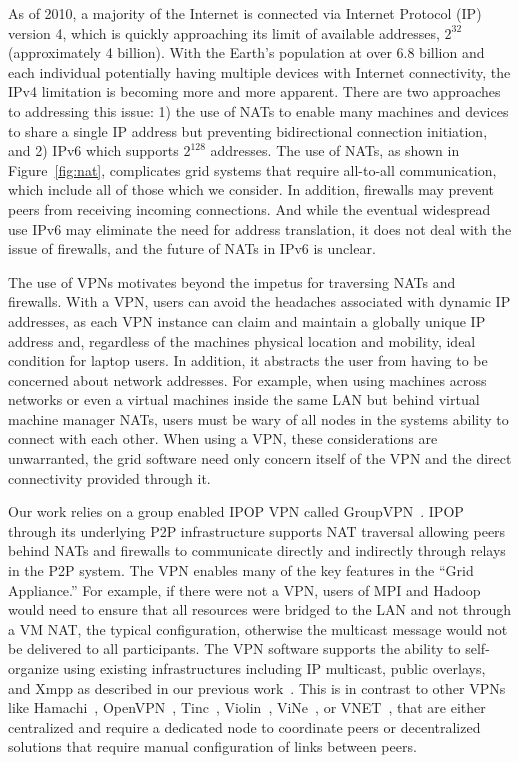 \documentclass[conference]{IEEEtran}
\begin{document}
As of 2010, a majority of the Internet is connected via Internet Protocol (IP)
version 4, which is quickly approaching its limit of available addresses,
$2^{32}$ (approximately 4 billion).  With the Earth's population at over 6.8
billion and each individual potentially having multiple devices with Internet
connectivity, the IPv4 limitation is becoming more and more apparent.  There
are two approaches to addressing this issue:  1) the use of NATs to enable many
machines and devices to share a single IP address but preventing bidirectional
connection initiation, and 2) IPv6 which supports $2^{128}$ addresses.  The use
of NATs, as shown in Figure~\ref{fig:nat}, complicates grid systems that
require all-to-all communication, which include all of those which we consider.
In addition, firewalls may prevent peers from receiving incoming connections.
And while the eventual widespread use IPv6 may eliminate the need for address
translation, it does not deal with the issue of firewalls, and the future of
NATs in IPv6 is unclear.

The use of VPNs motivates beyond the impetus for traversing NATs and firewalls.
With a VPN, users can avoid the headaches associated with dynamic IP addresses,
as each VPN instance can claim and maintain a globally unique IP address and,
regardless of the machines physical location and mobility, ideal condition for
laptop users.  In addition, it abstracts the user from having to be concerned
about network addresses.  For example, when using machines across networks or
even a virtual machines inside the same LAN but behind virtual machine manager
NATs, users must be wary of all nodes in the systems ability to connect with
each other.  When using a VPN, these considerations are unwarranted, the grid
software need only concern itself of the VPN and the direct connectivity
provided through it.

Our work relies on a group enabled IPOP VPN called GroupVPN~\cite{groupvpn}.
IPOP through its underlying P2P infrastructure supports NAT traversal allowing
peers behind NATs and firewalls to communicate directly and indirectly through
relays in the P2P system.  The VPN enables many of the key features in the
``Grid Appliance.'' For example, if there were not a VPN, users of MPI and
Hadoop would need to ensure that all resources were bridged to the LAN and not
through a VM NAT, the typical configuration, otherwise the multicast message
would not be delivered to all participants.  The VPN software supports the
ability to self-organize using existing infrastructures including IP multicast,
public overlays, and Xmpp as described in our previous
work~\cite{bootstrapping}.  This is in contrast to other VPNs like
Hamachi~\cite{hamachi}, OpenVPN~\cite{openvpn}, Tinc~\cite{tinc},
Violin~\cite{violin}, ViNe~\cite{vine}, or VNET~\cite{vnet}, that are either
centralized and require a dedicated node to coordinate peers or decentralized
solutions that require manual configuration of links between peers.
\end{document}
